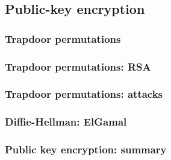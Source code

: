 \documentclass[10pt,a4paper]{report}
\begin{document}
\chapter{Public-key encryption}

\section{Trapdoor permutations}
\section{Trapdoor permutations: RSA}
\section{Trapdoor permutations: attacks}
\section{Diffie-Hellman: ElGamal}
\section{Public key encryption: summary}

\part{}
\end{document}
